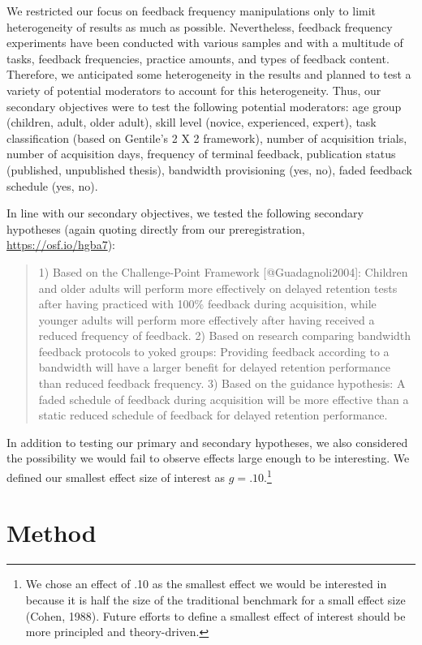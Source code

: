 \documentclass[
  english,
  man,mask,floatsintext]{apa7}
\begin{document}
We restricted our focus on feedback frequency manipulations only to limit heterogeneity of results as much as possible. Nevertheless, feedback frequency experiments have been conducted with various samples and with a multitude of tasks, feedback frequencies, practice amounts, and types of feedback content. Therefore, we anticipated some heterogeneity in the results and planned to test a variety of potential moderators to account for this heterogeneity. Thus, our secondary objectives were to test the following potential moderators: age group (children, adult, older adult), skill level (novice, experienced, expert), task classification (based on Gentile's 2 X 2 framework), number of acquisition trials, number of acquisition days, frequency of terminal feedback, publication status (published, unpublished thesis), bandwidth provisioning (yes, no), faded feedback schedule (yes, no).

In line with our secondary objectives, we tested the following secondary hypotheses (again quoting directly from our preregistration, \url{https://osf.io/hgba7}):

\blockquote{1) Based on the Challenge-Point Framework [@Guadagnoli2004]: Children and older adults will perform more effectively on delayed retention tests after having practiced with 100\% feedback during acquisition, while younger adults will perform more effectively after having received a reduced frequency of feedback. 
2)  Based on research comparing bandwidth feedback protocols to yoked groups: Providing feedback according to a bandwidth will have a larger benefit for delayed retention performance than reduced feedback frequency. 
3)  Based on the guidance hypothesis: A faded schedule of feedback during acquisition will be more effective than a static reduced schedule of feedback for delayed retention performance.}

In addition to testing our primary and secondary hypotheses, we also considered the possibility we would fail to observe effects large enough to be interesting. We defined our smallest effect size of interest as \(g = .10\).\footnote{We chose an effect of .10 as the smallest effect we would be interested in because it is half the size of the traditional benchmark for a small effect size (Cohen, 1988). Future efforts to define a smallest effect of interest should be more principled and theory-driven.}

\hypertarget{method}{%
\section{Method}\label{method}}
\end{document}

